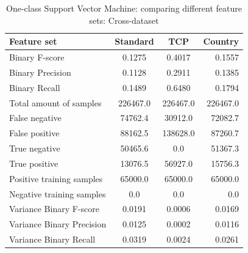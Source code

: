 \begin{table}[H]
\caption{One-class Support Vector Machine: comparing different feature sets: Cross-dataset}
\label{tab:one:cross}
\centering
\begin{tabular}{l c c r}
\toprule
Feature set & Standard & TCP & Country \\
\midrule
Binary F-score & 0.1275 & 0.4017 & 0.1557\\
Binary Precision & 0.1128 & 0.2911 & 0.1385 \\
Binary Recall & 0.1489 & 0.6480 & 0.1794\\
\midrule
Total amount of samples & 226467.0 & 226467.0 & 226467.0 \\
False negative & 74762.4 & 30912.0 & 72082.7 \\
False positive & 88162.5 & 138628.0 & 87260.7 \\
True negative & 50465.6 & 0.0 & 51367.3 \\
True positive & 13076.5 & 56927.0 & 15756.3 \\
\midrule
Positive training samples & 65000.0 & 65000.0 & 65000.0\\
Negative training samples & 0.0 & 0.0 & 0.0\\
\midrule
Variance Binary F-score & 0.0191 & 0.0006 & 0.0169 \\
Variance Binary Precision & 0.0125 &  0.0002 & 0.0116 \\
Variance Binary Recall & 0.0319 & 0.0024 & 0.0261 \\
\bottomrule
\end{tabular}
\end{table}
